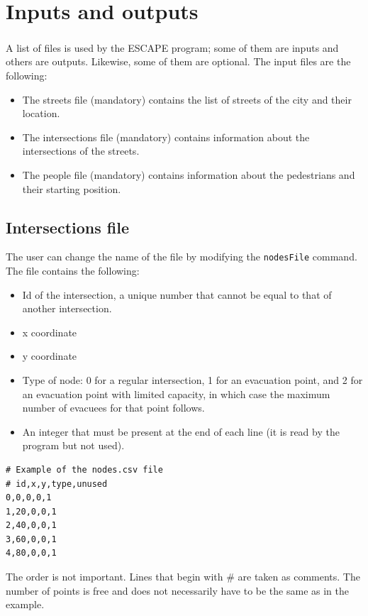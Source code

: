 \documentclass[12pt,a4paper]{book}
\newcommand{\escape}{ESCAPE\textsuperscript{\textregistered}}
\newenvironment{csvblock}{\par\noindent\begin{minipage}{\linewidth}}{\end{minipage}\par}
\begin{document}
\section{Inputs and outputs}
A list of files is used by the \escape{} program; some of them are inputs and others are outputs.
Likewise, some of them are optional. The input files are the following:
\begin{itemize}
  \item The streets file (mandatory) contains the list of streets of the city and their location.
  \item The intersections file (mandatory) contains information about the intersections of the
    streets.
  \item The people file (mandatory) contains information about the pedestrians and their starting
    position.
\end{itemize}

\subsection{Intersections file}\label{sec:nodesfile}
The user can change the name of the file by modifying the \texttt{nodesFile} command. The file
contains the following:
\begin{itemize}
  \item Id of the intersection, a unique number that cannot be equal to that of another
    intersection.
  \item x coordinate
  \item y coordinate
  \item Type of node: 0 for a regular intersection, 1 for an evacuation point, and 2 for an
    evacuation point with limited capacity, in which case the maximum number of evacuees for that
    point follows.
  \item An integer that must be present at the end of each line (it is read by the program but not
    used).
\end{itemize}
\begin{csvblock}
\begin{lstlisting}[style=csvfile]
# Example of the nodes.csv file
# id,x,y,type,unused
0,0,0,0,1
1,20,0,0,1
2,40,0,0,1
3,60,0,0,1
4,80,0,0,1
\end{lstlisting}
\end{csvblock}
The order is not important. Lines that begin with \# are taken as comments. The number of points is
free and does not necessarily have to be the same as in the example.
\end{document}
